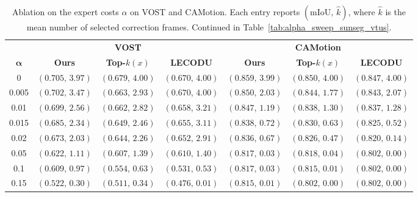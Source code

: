 \begin{table}[t]
\caption{Ablation on the expert costs \(\alpha\) on VOST and
CAMotion. Each entry reports
\((\mathrm{mIoU},\,\widehat{k})\), where
\(\widehat{k}\) is the mean number of selected correction
frames. Continued in Table~\ref{tab:alpha_sweep_sunseg_vtus}.}
\label{tab:alpha_sweep_vost_camotion}

\centering
\setlength{\tabcolsep}{4pt}
\renewcommand{\arraystretch}{1.08}
{\small
\begin{tabular}{@{}c*{6}{c}@{}}
\toprule
&
\multicolumn{3}{c}{\textbf{VOST}}
&
\multicolumn{3}{c}{\textbf{CAMotion}}
\\
\cmidrule(lr){2-4}
\cmidrule(lr){5-7}

\(\boldsymbol{\alpha}\)
& \textbf{Ours}
& \textbf{Top-\(k(x)\)}
& \textbf{LECODU}
& \textbf{Ours}
& \textbf{Top-\(k(x)\)}
& \textbf{LECODU}
\\
\midrule

0
& \((0.705,\,3.97)\)
& \((0.679,\,4.00)\)
& \((0.670,\,4.00)\)
& \((0.859,\,3.99)\)
& \((0.850,\,4.00)\)
& \((0.847,\,4.00)\)
\\

0.005
& \((0.702,\,3.47)\)
& \((0.663,\,2.93)\)
& \((0.670,\,4.00)\)
& \((0.850,\,2.03)\)
& \((0.844,\,1.77)\)
& \((0.843,\,2.07)\)
\\

0.01
& \((0.699,\,2.56)\)
& \((0.662,\,2.82)\)
& \((0.658,\,3.21)\)
& \((0.847,\,1.19)\)
& \((0.838,\,1.30)\)
& \((0.837,\,1.28)\)
\\

0.015
& \((0.685,\,2.34)\)
& \((0.649,\,2.46)\)
& \((0.655,\,3.11)\)
& \((0.838,\,0.72)\)
& \((0.830,\,0.63)\)
& \((0.825,\,0.52)\)
\\

0.02
& \((0.673,\,2.03)\)
& \((0.644,\,2.26)\)
& \((0.652,\,2.91)\)
& \((0.836,\,0.67)\)
& \((0.826,\,0.47)\)
& \((0.820,\,0.14)\)
\\

0.05
& \((0.622,\,1.11)\)
& \((0.607,\,1.39)\)
& \((0.610,\,1.40)\)
& \((0.817,\,0.03)\)
& \((0.818,\,0.04)\)
& \((0.802,\,0.00)\)
\\

0.1
& \((0.609,\,0.97)\)
& \((0.554,\,0.63)\)
& \((0.531,\,0.53)\)
& \((0.817,\,0.03)\)
& \((0.815,\,0.01)\)
& \((0.802,\,0.00)\)
\\

0.15
& \((0.522,\,0.30)\)
& \((0.511,\,0.34)\)
& \((0.476,\,0.01)\)
& \((0.815,\,0.01)\)
& \((0.802,\,0.00)\)
& \((0.802,\,0.00)\)
\\


\end{tabular}}
\end{table}
